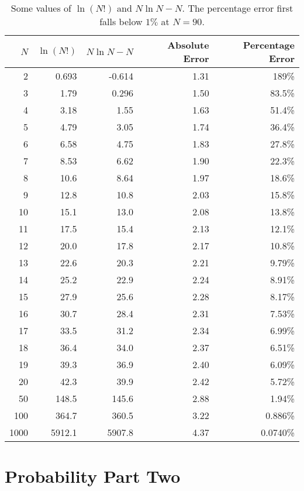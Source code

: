 \documentclass[a4paper]{article}
\begin{document}
    \begin{table}[ht]
        \centering
        \begin{tabular}{rrrrr}\hline
            \(N\) & \(\ln(N!)\) & \(N\ln N - N\) & Absolute Error & Percentage Error\\\hline
            2 & 0.693 & -0.614 & 1.31 & 189\%\\
            3 & 1.79 & 0.296 & 1.50 & 83.5\%\\
            4 & 3.18 & 1.55 & 1.63 & 51.4\%\\
            5 & 4.79 & 3.05 & 1.74 & 36.4\%\\
            6 & 6.58 & 4.75 & 1.83 & 27.8\%\\
            7 & 8.53 & 6.62 & 1.90 & 22.3\%\\
            8 & 10.6 & 8.64 & 1.97 & 18.6\%\\
            9 & 12.8 & 10.8 & 2.03 & 15.8\%\\
            10 & 15.1 & 13.0 & 2.08 & 13.8\%\\
            11 & 17.5 & 15.4 & 2.13 & 12.1\%\\
            12 & 20.0 & 17.8 & 2.17 & 10.8\%\\
            13 & 22.6 & 20.3 & 2.21 & 9.79\%\\
            14 & 25.2 & 22.9 & 2.24 & 8.91\%\\
            15 & 27.9 & 25.6 & 2.28 & 8.17\%\\
            16 & 30.7 & 28.4 & 2.31 & 7.53\%\\
            17 & 33.5 & 31.2 & 2.34 & 6.99\%\\
            18 & 36.4 & 34.0 & 2.37 & 6.51\%\\
            19 & 39.3 & 36.9 & 2.40 & 6.09\%\\
            20 & 42.3 & 39.9 & 2.42 & 5.72\%\\
            50 & 148.5 & 145.6 & 2.88 & 1.94\%\\
            100 & 364.7 & 360.5 & 3.22 & 0.886\%\\
            1000 & 5912.1 & 5907.8 & 4.37 & 0.0740\%\\\hline
        \end{tabular}
        \caption{Some values of \(\ln(N!)\) and \(N\ln N - N\). The percentage error first falls below \(1\%\) at \(N = 90\).}
    \end{table}
    
    \section{Probability Part Two}
\end{document}
